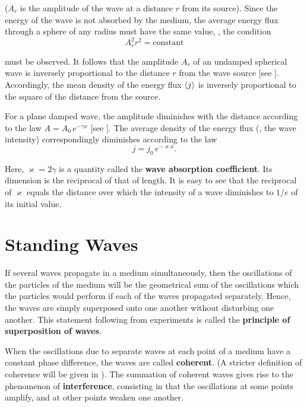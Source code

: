 \noindent
($A_r$ is the amplitude of the wave at a distance $r$ from its source).
Since the energy of the wave is not absorbed by the medium, the average energy flux through a sphere of any radius must have the same value, \ie, the condition
\begin{equation*}
	A_r^2 r^2 = \text{constant}
\end{equation*}

\noindent
must be observed.
It follows that the amplitude $A_r$ of an undamped spherical wave is inversely proportional to the distance $r$ from the wave source [see ].
Accordingly, the mean density of the energy flux $\left\langle j \right\rangle$ is inversely proportional to the square of the distance from the source.

For a plane damped wave, the amplitude diminishes with the distance according to the law $A = A_0\,e^{-\gamma x}$ [see ].
The average density of the energy flux (\ie, the wave intensity) correspondingly diminishes according to the law
\begin{equation}\label{eq:14_52}
	j = j_0\, e^{-\varkappa x}.
\end{equation}

\noindent
Here, $\varkappa = 2\gamma$ is a quantity called the \textbf{wave absorption coefficient}.
Its dimension is the reciprocal of that of length.
It is easy to see that the reciprocal of $\varkappa$ equals the distance over which the intensity of a wave diminishes to $1/e$ of its initial value.

\section{Standing Waves}\label{sec:14_7}

If several waves propagate in a medium simultaneously, then the oscillations of the particles of the medium will be the geometrical sum of the oscillations which the particles would perform if each of the waves propagated separately.
Hence, the waves are simply superposed onto one another without disturbing one another.
This statement following from experiments is called the \textbf{principle of superposition of waves}.

When the oscillations due to separate waves at each point of a medium have a constant phase difference, the waves are called \textbf{coherent}.
(A stricter definition of coherence will be given in ).
The summation of coherent waves gives rise to the phenomenon of \textbf{interference}, consisting in that the oscillations at some points amplify, and at other points weaken one another.


